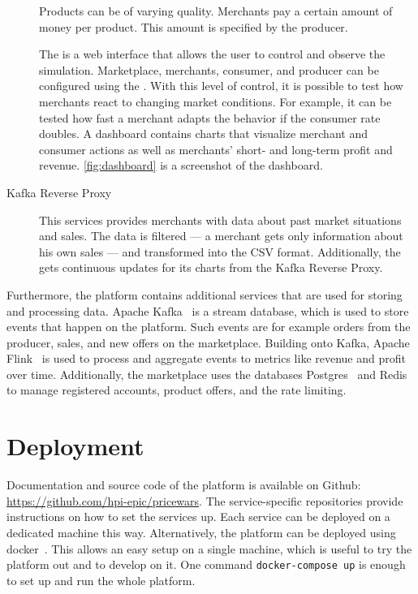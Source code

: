 \begin{description}
		Products can be of varying quality.
		Merchants pay a certain amount of money per product.
		This amount is specified by the producer.
	\item [\UI]
		The \ui is a web interface that allows the user to control and observe the simulation.
		Marketplace, merchants, consumer, and producer can be configured using the \ui.
		With this level of control, it is possible to test how merchants react to changing market conditions.
		For example, it can be tested how fast a merchant adapts the behavior if the consumer rate doubles.
		A dashboard contains charts that visualize merchant and consumer actions as well as merchants' short- and long-term profit and revenue.
		\cref{fig:dashboard} is a screenshot of the dashboard.
	\item [Kafka Reverse Proxy]
		This services provides merchants with data about past market situations and sales.
		The data is filtered --- a merchant gets only information about his own sales --- and transformed into the CSV format.
		Additionally, the \ui gets continuous updates for its charts from the Kafka Reverse Proxy.
		
\end{description}

Furthermore, the \pricewars platform contains additional services that are used for storing and processing data.
Apache Kafka~\cite{garg2013apache} is a stream database, which is used to store events that happen on the platform. Such events are for example orders from the producer, sales, and new offers on the marketplace.
Building onto Kafka, Apache Flink~\cite{carbone2015apache} is used to process and aggregate events to metrics like revenue and profit over time.
Additionally, the marketplace uses the databases Postgres~\cite{postgres} and Redis~\cite{carlson2013redis} to manage registered accounts, product offers, and the rate limiting.

\section{Deployment}
Documentation and source code of the \pricewars platform is available on Github: \url{https://github.com/hpi-epic/pricewars}.
The service-specific repositories provide instructions on how to set the services up.
Each service can be deployed on a dedicated machine this way.
Alternatively, the \pricewars platform can be deployed using docker~\cite{Merkel:2014:DLL:2600239.2600241}.
This allows an easy setup on a single machine, which is useful to try the platform out and to develop on it.
One command \texttt{docker-compose up} is enough to set up and run the whole \pricewars platform.
